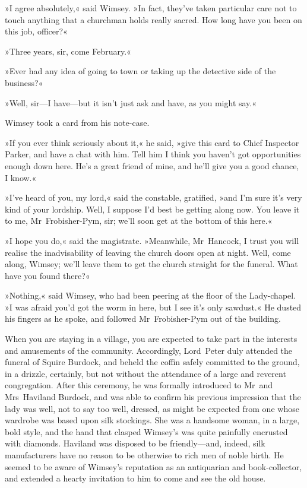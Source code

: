 »I agree absolutely,« said Wimsey. »In fact, they've taken particular care not to touch anything that a churchman holds really sacred. How long have you been on this job, officer?«

»Three years, sir, come February.«

»Ever had any idea of going to town or taking up the detective side of the business?«

»Well, sir—I have—but it isn't just ask and have, as you might say.«

Wimsey took a card from his note-case.

»If you ever think seriously about it,« he said, »give this card to Chief Inspector Parker, and have a chat with him. Tell him I think you haven't got opportunities enough down here. He's a great friend of mine, and he'll give you a good chance, I know.«

»I've heard of you, my lord,« said the constable, gratified, »and I'm sure it's very kind of your lordship. Well, I suppose I'd best be getting along now. You leave it to me, Mr~Frobisher-Pym, sir; we'll soon get at the bottom of this here.«

»I hope you do,« said the magistrate. »Meanwhile, Mr~Hancock, I trust you will realise the inadvisability of leaving the church doors open at night. Well, come along, Wimsey; we'll leave them to get the church straight for the funeral. What have you found there?«

»Nothing,« said Wimsey, who had been peering at the floor of the Lady-chapel. »I was afraid you'd got the worm in here, but I see it's only sawdust.« He dusted his fingers as he spoke, and followed Mr~Frobisher-Pym out of the building.

\divider
When you are staying in a village, you are expected to take part in the interests and amusements of the community. Accordingly, Lord~Peter duly attended the funeral of Squire Burdock, and beheld the coffin safely committed to the ground, in a drizzle, certainly, but not without the attendance of a large and reverent congregation. After this ceremony, he was formally introduced to Mr~and Mrs~Haviland Burdock, and was able to confirm his previous impression that the lady was well, not to say too well, dressed, as might be expected from one whose wardrobe was based upon silk stockings. She was a handsome woman, in a large, bold style, and the hand that clasped Wimsey's was quite painfully encrusted with diamonds. Haviland was disposed to be friendly—and, indeed, silk manufacturers have no reason to be otherwise to rich men of noble birth. He seemed to be aware of Wimsey's reputation as an antiquarian and book-collector, and extended a hearty invitation to him to come and see the old house.

